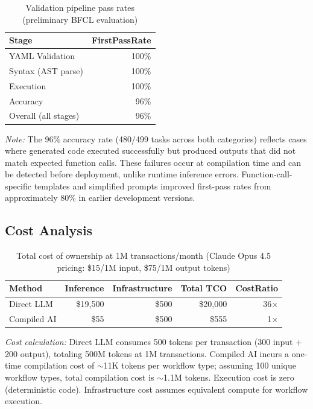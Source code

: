 \documentclass[11pt]{article}
\begin{document}
\begin{table}[ht]
\centering
\caption{Validation pipeline pass rates (preliminary BFCL evaluation)}
\label{tab:validation-results}
\begin{tabular}{lr}
\toprule
Stage & FirstPassRate \\
\midrule
YAML Validation & 100\% \\
Syntax (AST parse) & 100\% \\
Execution & 100\% \\
Accuracy & 96\% \\
\midrule
Overall (all stages) & 96\% \\
\bottomrule
\end{tabular}
\end{table}

\noindent\textit{Note:} The 96\% accuracy rate (480/499 tasks across both categories) reflects cases where generated code executed successfully but produced outputs that did not match expected function calls. These failures occur at compilation time and can be detected before deployment, unlike runtime inference errors. Function-call-specific templates and simplified prompts improved first-pass rates from approximately 80\% in earlier development versions.

\subsection{Cost Analysis}

\begin{table}[ht]
\centering
\caption{Total cost of ownership at 1M transactions/month (Claude Opus 4.5 pricing: \$15/1M input, \$75/1M output tokens)}
\label{tab:cost-results}
\begin{tabular}{lrrrr}
\toprule
Method & Inference & Infrastructure & Total TCO & CostRatio \\
\midrule
Direct LLM & \$19,500 & \$500 & \$20,000 & 36$\times$ \\
Compiled AI & \$55 & \$500 & \$555 & 1$\times$ \\
\bottomrule
\end{tabular}
\end{table}

\noindent\textit{Cost calculation:} Direct LLM consumes 500 tokens per transaction (300 input + 200 output), totaling 500M tokens at 1M transactions. Compiled AI incurs a one-time compilation cost of $\sim$11K tokens per workflow type; assuming 100 unique workflow types, total compilation cost is $\sim$1.1M tokens. Execution cost is zero (deterministic code). Infrastructure cost assumes equivalent compute for workflow execution.
\end{document}

